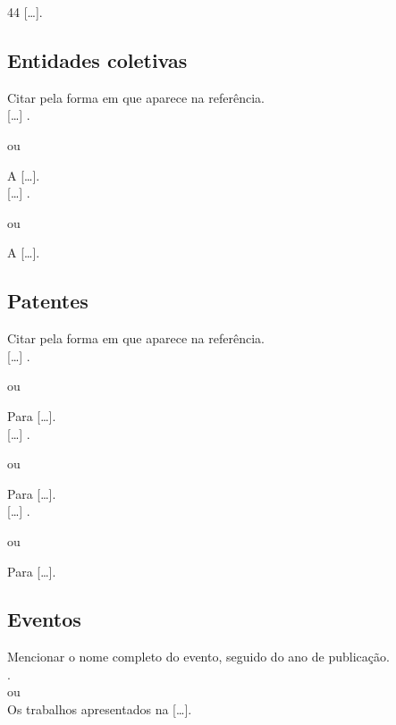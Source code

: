 44 [\ldots]. \\

\subsection{Entidades coletivas}

Citar pela forma em que aparece na referência.\\

[\ldots] \cite{Sergipe2010}.

ou 

A  [\ldots]. \\


[\ldots] \cite{Food2005}.

ou 

A  [\ldots]. \\


\subsection{Patentes}

Citar pela forma em que aparece na referência.\\

[\ldots] \cite{Bagnato2018}.

ou 

Para  [\ldots]. \\

[\ldots] \cite{Rocha2017}.

ou 

Para  [\ldots]. \\

[\ldots] \cite{Vicente2010}.

ou 

Para  [\ldots]. \\

\subsection{Eventos}

Mencionar o nome completo do evento, seguido do ano de publicação.\\

\cite{reuniao1985}.\\

ou\\

Os trabalhos apresentados na  [\ldots].\\

